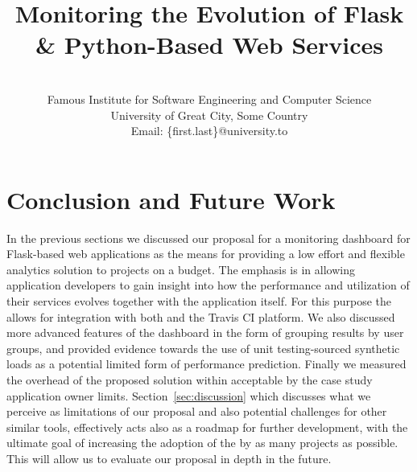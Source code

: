 \documentclass[conference]{IEEEtran}
\begin{document}
	

\title{Monitoring the Evolution of Flask \& Python-Based Web Services}

\author{
\\
Famous Institute for Software Engineering and Computer Science\\
University of Great City, Some Country\\
Email: \{first.last\}@university.to 
}


\maketitle



















% 






\section{Conclusion and Future Work}
\label{sec:conclusions}

In the previous sections we discussed our proposal for a monitoring dashboard for Flask-based web applications as the means for providing a low effort and flexible analytics solution to projects on a budget. The emphasis is in allowing application developers to gain insight into how the performance and utilization of their services evolves together with the application itself. For this purpose the \tool allows for integration with both \git and the Travis CI platform. We also discussed more advanced features of the dashboard in the form of grouping results by user groups, and provided evidence towards the use of unit testing-sourced synthetic loads as a potential limited form of performance prediction. Finally we measured the overhead of the proposed solution within acceptable by the case study application owner limits. Section~\ref{sec:discussion} which discusses what we perceive as limitations of our proposal and also potential challenges for other similar tools, effectively acts also as a roadmap for further development, with the ultimate goal of increasing the adoption of the \tool by as many projects as possible. This will allow us to evaluate our proposal in depth in the future.
\end{document}
